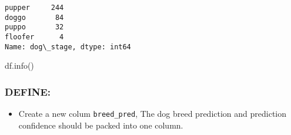 \documentclass[11pt]{article}
\makeatletter
\providecommand{\tightlist}{%
      \setlength{\itemsep}{0pt}\setlength{\parskip}{0pt}}
\newcommand{\boxspacing}{\kern\kvtcb@left@rule\kern\kvtcb@boxsep}
\newcommand{\prompt}[4]{
        {\ttfamily\llap{{\color{#2}[#3]:\hspace{3pt}#4}}\vspace{-\baselineskip}}
    }
\makeatother
\begin{document}
            \begin{tcolorbox}[breakable, size=fbox, boxrule=.5pt, pad at break*=1mm, opacityfill=0]
\prompt{Out}{outcolor}{58}{\boxspacing}
\begin{Verbatim}[commandchars=\\\{\}]
pupper     244
doggo       84
puppo       32
floofer      4
Name: dog\_stage, dtype: int64
\end{Verbatim}
\end{tcolorbox}
        
    df.info()

    \hypertarget{define}{%
\subsubsection{DEFINE:}\label{define}}

\begin{itemize}
\tightlist
\item
  Create a new colum \texttt{breed\_pred}, The dog breed prediction and
  prediction confidence should be packed into one column.
\end{itemize}
\end{document}
